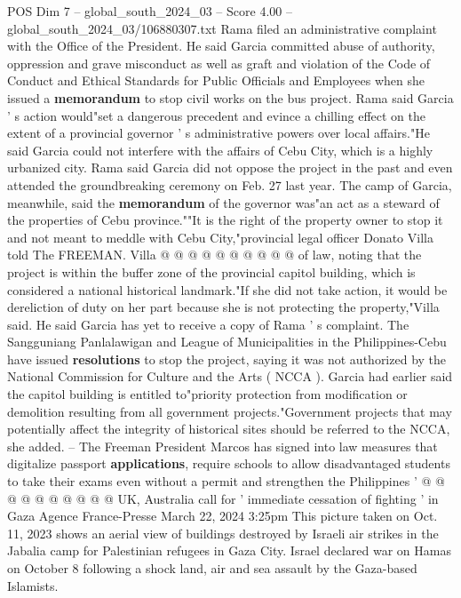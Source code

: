 \begin{textsample}{POS Dim 7 – global\_south\_2024\_03 – Score 4.00 – global\_south\_2024\_03/106880307.txt}  \label{ex:f7_pos_020}
Rama filed an administrative complaint with the Office of the President.
He said Garcia committed abuse of authority, oppression and grave misconduct as well as graft and violation of the Code of Conduct and Ethical Standards for Public Officials and Employees when she issued a \textbf{memorandum} to stop civil works on the bus project.
Rama said Garcia ' s action would"set a dangerous precedent and evince a chilling effect on the extent of a provincial governor ' s administrative powers over local affairs."He said Garcia could not interfere with the affairs of Cebu City, which is a highly urbanized city.
Rama said Garcia did not oppose the project in the past and even attended the groundbreaking ceremony on Feb. 27 last year.
The camp of Garcia, meanwhile, said the \textbf{memorandum} of the governor was"an act as a steward of the properties of Cebu province.""It is the right of the property owner to stop it and not meant to meddle with Cebu City,"provincial legal officer Donato Villa told The FREEMAN.
Villa @ @ @ @ @ @ @ @ @ @ of law, noting that the project is within the buffer zone of the provincial capitol building, which is considered a national historical landmark."If she did not take action, it would be dereliction of duty on her part because she is not protecting the property,"Villa said.
He said Garcia has yet to receive a copy of Rama ' s complaint.
The Sangguniang Panlalawigan and League of Municipalities in the Philippines-Cebu have issued \textbf{resolutions} to stop the project, saying it was not authorized by the National Commission for Culture and the Arts ( NCCA ).
Garcia had earlier said the capitol building is entitled to"priority protection from modification or demolition resulting from all government projects."Government projects that may potentially affect the integrity of historical sites should be referred to the NCCA, she added. -- The Freeman President Marcos has signed into law measures that digitalize passport \textbf{applications}, require schools to allow disadvantaged students to take their exams even without a permit and strengthen the Philippines ' @ @ @ @ @ @ @ @ @ @ UK, Australia call for ' immediate cessation of fighting ' in Gaza Agence France-Presse March 22, 2024 3:25pm This picture taken on Oct. 11, 2023 shows an aerial view of buildings destroyed by Israeli air strikes in the Jabalia camp for Palestinian refugees in Gaza City.
Israel declared war on Hamas on October 8 following a shock land, air and sea assault by the Gaza-based Islamists.

\end{textsample}

